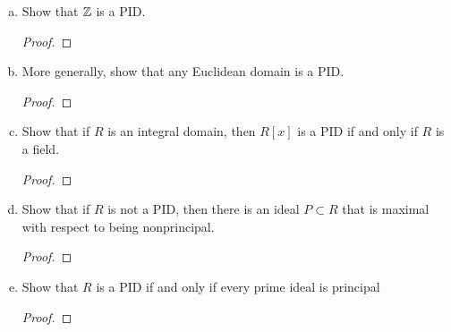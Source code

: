 \begin{itemize}
\begin{enumerate}[(a)]
\begin{enumerate}[(i)]
        \item Every subgroup of $G$ is cyclic.
        \begin{proof}

        \end{proof}
        \item $G \cong \bbz$.
        \begin{proof}

        \end{proof}
    \end{enumerate}


\item Show that $\mathbb{Z}$ is a PID.
\begin{proof}

\end{proof}


\item More generally, show that any Euclidean domain is a PID.
\begin{proof}

\end{proof}

\item Show that if $R$ is an integral domain, then $R[x]$ is a PID if and only if $R$ is a field.
\begin{proof}

\end{proof}


\item Show that if $R$ is not a PID, then there is an ideal $P \subset R$ that is
maximal with respect to being nonprincipal.
\begin{proof}

\end{proof}


\item Show that $R$ is a PID if and only if every prime ideal is principal
\begin{proof}

\end{proof}
\end{enumerate}









\end{itemize}
